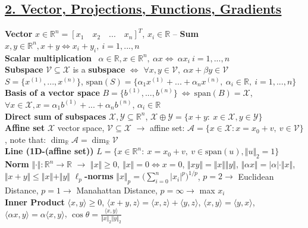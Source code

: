 \documentclass[a4paper]{article}
\begin{document}
\subsection*{\underline{2. Vector, Projections, Functions, Gradients}}
\textbf{Vector} $x \in \mathbb{R}^n = [x_1 \quad x_2 \quad ... \quad x_n]^T$, $x_i\in\mathbb{R}$ -- 
\textbf{Sum} $x, y \in \mathbb{R}^n, x+y \iff x_i+y_i, \ i=1,...,n$\\
\textbf{Scalar multiplication} \ $\alpha \in \mathbb{R}, x \in \mathbb{R}^n, \ \alpha x \iff \ \alpha{x_i} \ i=1,...,n $\\
\textbf{Subspace} $\mathcal{V} \subseteq \mathcal{X}$ is a \textbf{subspace} $\iff$ $\forall x, y \in \mathcal{V}, \ \alpha{x}+\beta{y}\in\mathcal{V}$\\
$S=\{x^{(1)},...,x^{(n)}\}$, $\text{span}(S)=\{\alpha_1{x^{(1)}}+...+\alpha_n{x^{(n)}}, \ \alpha_i \in \mathbb{R}, \ i=1,...,n\}$\\
\textbf{Basis of a vector space} $B=\{b^{(1)}, ..., b^{(n)}\} \ \iff \ \text{span}(B)=\mathcal{X}$, $\forall x \in \mathcal{X}, x=\alpha_1{b^{(1)}+...+\alpha_n{b^{(n)}}}$, $\alpha_i\in\mathbb{R}$\\
\textbf{Direct sum of subspaces} $\mathcal{X,Y}\subseteq \mathbb{R}^n$, $\mathcal{X} \oplus \mathcal{Y}=\{x+y: \ x\in\mathcal{X}, y\in\mathcal{Y}\}$\\
\textbf{Affine set} $\mathcal{X}$ vector space, $\mathcal{V}\subseteq\mathcal{X}$ $\to$ affine set: $\mathcal{A}=\{x\in\mathcal{X}: x=x_0+v, \ v\in\mathcal{V}\}$, note that: $\dim_{\mathbb{R}}{\mathcal{A}}=\dim_{\mathbb{R}}{\mathcal{V}}$\\
\textbf{Line (1D-(affine set))} $L=\{x\in\mathbb{R}^n: \ x=x_0+v, \ v \in \text{span}(u), \Vert u \Vert_2=1\}$\\
\textbf{Norm} $\Vert \cdot \Vert: \mathbb{R}^n \to \mathbb{R}$ $\to$ $\Vert x \Vert \ge 0, \ \Vert x \Vert = 0 \iff x=0 $, 
$\Vert xy \Vert = \Vert x \Vert \Vert y \Vert$, $\Vert \alpha{x} \Vert =\vert \alpha \vert \cdot \Vert x \Vert$, 
$\Vert x+y \Vert \le \Vert x \Vert + \Vert y \Vert$ 
\textbf{$\ell_p$-norms} $\Vert x \Vert_p = \biggl(
    \sum_{i=0}^n{\vert x_i \vert}^p
\biggr)^{1/p}$, $p=2 \to $ Euclidean Distance, $p=1 \to$ Manahattan Distance, $p=\infty\to$ max $x_i$\\
\textbf{Inner Product}  $\langle x,y \rangle \ge 0$, $\langle x+y, z \rangle = \langle x,z \rangle + \langle y,z\rangle$, $\langle x,y\rangle=\langle y,x \rangle$, $\langle \alpha{x}, y \rangle=\alpha{\langle x,y \rangle }$, $\cos\theta=\frac{\langle{x,y}\rangle}{\Vert{x}\Vert_2 \Vert{y}\Vert_2 }$ \\
\end{document}
